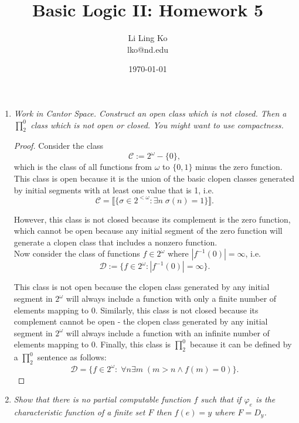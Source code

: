 \documentclass{article}
\begin{document}
\title{Basic Logic II: Homework 5}
\author{Li Ling Ko\\ lko@nd.edu}
\date{\today}
\maketitle

\begin{enumerate}[label={\bf Q\arabic*:}]
  \item \it Work in Cantor Space. Construct an open class which is not
    closed. Then a $\prod_2^0$ class which is not open or closed. You might
    want to use compactness.

    \begin{proof}
      Consider the class
      \[\mathcal{C} :=2^\omega-\{0\},\]
      which is the class of all functions from $\omega$ to $\{0,1\}$ minus
      the zero function. This class is open because it is the union of the
      basic clopen classes generated by initial segments with at least one
      value that is 1, i.e.
      \[\mathcal{C} =\llbracket\{\sigma\in2^{<\omega}: \exists n\;
      \sigma(n)=1\}\rrbracket.\]

      However, this class is not closed because its complement is the zero
      function, which cannot be open because any initial segment of the
      zero function will generate a clopen class that includes a nonzero
      function. \\

      Now consider the class of functions $f\in2^\omega$ where
      $|f^{-1}(0)|=\infty$, i.e.
      \[\mathcal{D} :=\{f\in2^\omega: |f^{-1}(0)|=\infty\}.\]

      This class is not open because the clopen class generated by any
      initial segment in $2^\omega$ will always include a function with
      only a finite number of elements mapping to 0.  Similarly, this class
      is not closed because its complement cannot be open - the clopen
      class generated by any initial segment in $2^\omega$ will always
      include a function with an infinite number of elements mapping to 0.
      Finally, this class is $\prod_2^0$ because it can be defined by a
      $\prod_2^0$ sentence as follows:
      \[\mathcal{D} =\{f\in2^\omega:\; \forall n\exists m\; (m>n \wedge
      f(m)=0)\}.\]
    \end{proof}

  \item \it Show that there is no partial computable function $f$ such that
    if $\varphi_e$ is the characteristic function of a finite set $F$ then
    $f(e)=y$ where $F=D_y$.


\end{enumerate}
\end{document}
